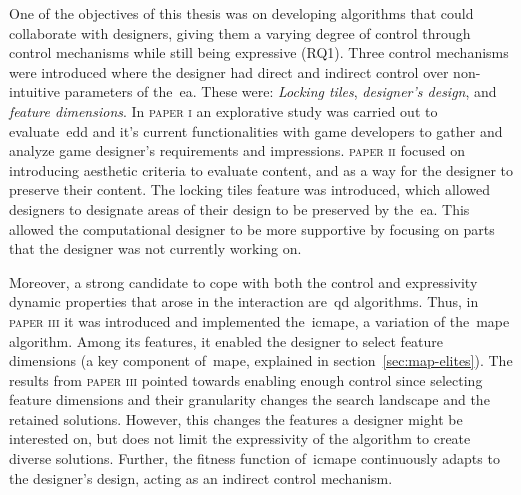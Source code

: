 

One of the objectives of this thesis was on developing algorithms that could collaborate with designers, giving them a varying degree of control through control mechanisms while still being expressive (RQ1). Three control mechanisms were introduced where the designer had direct and indirect control over non-intuitive parameters of the~\acrshort{ea}. These were: \emph{Locking tiles}, \emph{designer's design}, and \emph{feature dimensions}. In \textsc{paper i} an explorative study was carried out to evaluate~\acrshort{edd} and it's current functionalities with game developers to gather and analyze game designer's requirements and impressions. \textsc{paper ii} focused on introducing aesthetic criteria to evaluate content, and as a way for the designer to preserve their content. The locking tiles feature was introduced, which allowed designers to designate areas of their design to be preserved by the~\acrshort{ea}. This allowed the computational designer to be more supportive by focusing on parts that the designer was not currently working on.


Moreover, a strong candidate to cope with both the control and expressivity dynamic properties that arose in the interaction are~\acrshort{qd} algorithms. Thus, in \textsc{paper iii} it was introduced and implemented the~\acrlong{icmape}, a variation of the~\acrshort{mape} algorithm. Among its features, it enabled the designer to select feature dimensions (a key component of~\acrshort{mape}, explained in section~\ref{sec:map-elites}). The results from \textsc{paper iii} pointed towards enabling enough control since selecting feature dimensions and their granularity changes the search landscape and the retained solutions. However, this changes the features a designer might be interested on, but does not limit the expressivity of the algorithm to create diverse solutions. Further, the fitness function of~\acrshort{icmape} continuously adapts to the designer's design, acting as an indirect control mechanism.

